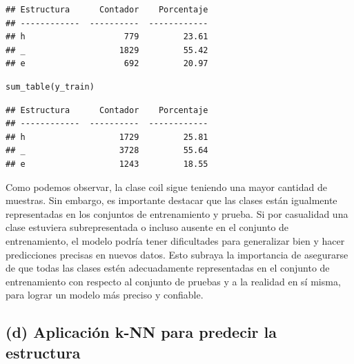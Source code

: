 \documentclass[
]{article}
\begin{document}
\begin{lstlisting}
## Estructura      Contador    Porcentaje
## ------------  ----------  ------------
## h                    779         23.61
## _                   1829         55.42
## e                    692         20.97
\end{lstlisting}

\begin{lstlisting}[language=Python]
sum_table(y_train)
\end{lstlisting}

\begin{lstlisting}
## Estructura      Contador    Porcentaje
## ------------  ----------  ------------
## h                   1729         25.81
## _                   3728         55.64
## e                   1243         18.55
\end{lstlisting}

Como podemos observar, la clase coil sigue teniendo una mayor cantidad
de muestras. Sin embargo, es importante destacar que las clases están
igualmente representadas en los conjuntos de entrenamiento y prueba. Si
por casualidad una clase estuviera subrepresentada o incluso ausente en
el conjunto de entrenamiento, el modelo podría tener dificultades para
generalizar bien y hacer predicciones precisas en nuevos datos. Esto
subraya la importancia de asegurarse de que todas las clases estén
adecuadamente representadas en el conjunto de entrenamiento con respecto
al conjunto de pruebas y a la realidad en sí misma, para lograr un
modelo más preciso y confiable.

\hypertarget{d-aplicaciuxf3n-k-nn-para-predecir-la-estructura}{%
\subsection{(d) Aplicación k-NN para predecir la
estructura}\label{d-aplicaciuxf3n-k-nn-para-predecir-la-estructura}}
\end{document}
